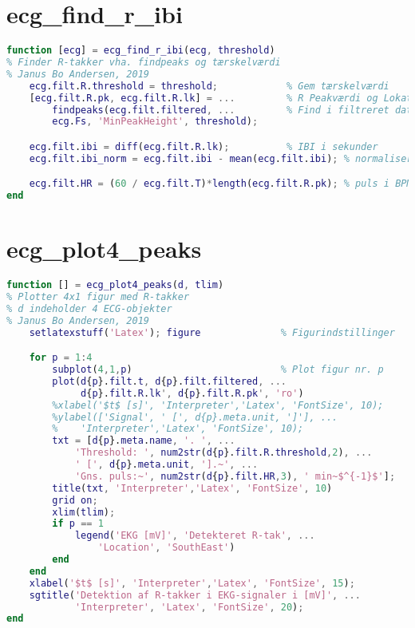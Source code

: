 \documentclass[a4paper]{report}
\begin{document}
\section{ecg\_find\_r\_ibi}

        
\begin{lstlisting}[language=Matlab, style=Matlab-editor]
function [ecg] = ecg_find_r_ibi(ecg, threshold)
% Finder R-takker vha. findpeaks og tærskelværdi
% Janus Bo Andersen, 2019
    ecg.filt.R.threshold = threshold;            % Gem tærskelværdi
    [ecg.filt.R.pk, ecg.filt.R.lk] = ...         % R Peakværdi og Lokation
        findpeaks(ecg.filt.filtered, ...         % Find i filtreret data
        ecg.Fs, 'MinPeakHeight', threshold);

    ecg.filt.ibi = diff(ecg.filt.R.lk);          % IBI i sekunder
    ecg.filt.ibi_norm = ecg.filt.ibi - mean(ecg.filt.ibi); % normaliseret

    ecg.filt.HR = (60 / ecg.filt.T)*length(ecg.filt.R.pk); % puls i BPM
end
\end{lstlisting}



\section{ecg\_plot4\_peaks}

        
\begin{lstlisting}[language=Matlab, style=Matlab-editor]
function [] = ecg_plot4_peaks(d, tlim)
% Plotter 4x1 figur med R-takker
% d indeholder 4 ECG-objekter
% Janus Bo Andersen, 2019
    setlatexstuff('Latex'); figure              % Figurindstillinger

    for p = 1:4
        subplot(4,1,p)                          % Plot figur nr. p
        plot(d{p}.filt.t, d{p}.filt.filtered, ...
             d{p}.filt.R.lk', d{p}.filt.R.pk', 'ro')
        %xlabel('$t$ [s]', 'Interpreter','Latex', 'FontSize', 10);
        %ylabel(['Signal', ' [', d{p}.meta.unit, ']'], ...
        %    'Interpreter','Latex', 'FontSize', 10);
        txt = [d{p}.meta.name, '. ', ...
            'Threshold: ', num2str(d{p}.filt.R.threshold,2), ...
            ' [', d{p}.meta.unit, '].~', ...
            'Gns. puls:~', num2str(d{p}.filt.HR,3), ' min~$^{-1}$'];
        title(txt, 'Interpreter','Latex', 'FontSize', 10)
        grid on;
        xlim(tlim);
        if p == 1
            legend('EKG [mV]', 'Detekteret R-tak', ...
                'Location', 'SouthEast')
        end
    end
    xlabel('$t$ [s]', 'Interpreter','Latex', 'FontSize', 15);
    sgtitle('Detektion af R-takker i EKG-signaler i [mV]', ...
            'Interpreter', 'Latex', 'FontSize', 20);
end
\end{lstlisting}
\end{document}
